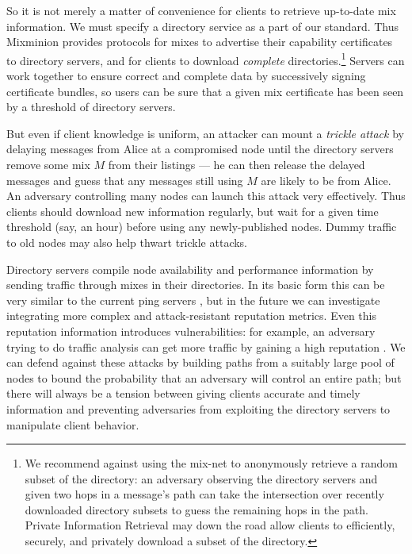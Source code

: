 \documentclass[11pt]{IEEEtran}
\begin{document}
So it is not merely a matter of convenience for clients to retrieve
up-to-date mix information.
We must specify a directory
service as a part of our standard. Thus Mixminion provides protocols for
mixes to advertise their capability certificates to directory servers,
and for clients to download \emph{complete} directories.\footnote{
  We recommend against using the mix-net to anonymously retrieve a random
  subset of the directory: an adversary observing the directory servers
  and given two hops in a message's path can take the intersection over
  recently downloaded directory subsets to guess the remaining hops in
  the path. Private Information Retrieval \cite{malkin-thesis} may down
  the road allow clients to efficiently, securely, and privately download
  a subset of the directory.
}
Servers can work together to ensure correct and complete data by
successively signing certificate bundles, so users can be sure that a
given mix certificate has been seen by a threshold of directory servers.

But even if client knowledge is uniform, an attacker can mount a
\emph{trickle attack} by delaying messages from Alice at a compromised
node until the directory servers remove some mix $M$ from their listings
--- he can then release the delayed messages and guess that any messages
still using $M$ are likely to be from Alice. An adversary controlling
many nodes can launch this attack very effectively. Thus clients
should download new information regularly,
but wait for a given time threshold (say, an hour) before using any
newly-published nodes. Dummy traffic to old nodes may also 
help thwart trickle attacks.

Directory servers compile node availability and performance information by
sending traffic through mixes in their directories. In its basic form this
can be very similar to the current ping servers \cite{levien}, but in the
future we can investigate integrating more complex and attack-resistant
reputation metrics.   Even this reputation information introduces
vulnerabilities: for example, an adversary 
trying to do traffic analysis
can get more traffic by gaining a high reputation \cite{mix-acc}. We can
defend against these attacks by building paths from a suitably large pool
of nodes \cite{casc-rep} to bound the probability that an adversary will
control an entire path; but there will always be a tension between giving
clients accurate and timely information and preventing adversaries from
exploiting the directory servers to manipulate client behavior.
\end{document}
